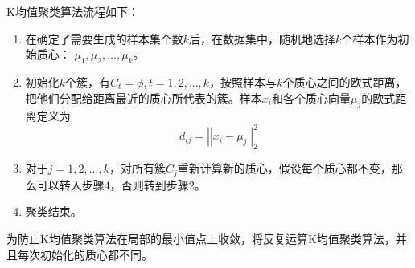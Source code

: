 K均值聚类算法流程如下：
\begin{enumerate}
	\item 在确定了需要生成的样本集个数${k}$后，在数据集中，随机地选择${k}$个样本作为初始质心： ${{\mu_1,\mu_2,\ldots,\mu_k}}$。%
	\item 初始化${k}$个簇，有${C_t=\phi,t=1,2,\ldots,k}$，按照样本与${k}$个质心之间的欧式距离，把他们分配给距离最近的质心所代表的簇。样本${x_i}$和各个质心向量${\mu_j}$的欧式距离定义为
	\begin{equation}
		d_{ij}=\left|\left|x_i-\mu_j\right|\right|_2^2
	\end{equation}
	
	\item 对于${j=1,2,...,k}$，对所有簇${C_j}$重新计算新的质心，假设每个质心都不变，那么可以转入步骤4，否则转到步骤2。
	\item 聚类结束。
\end{enumerate}



为防止K均值聚类算法在局部的最小值点上收敛，将反复运算K均值聚类算法，并且每次初始化的质心都不同。


